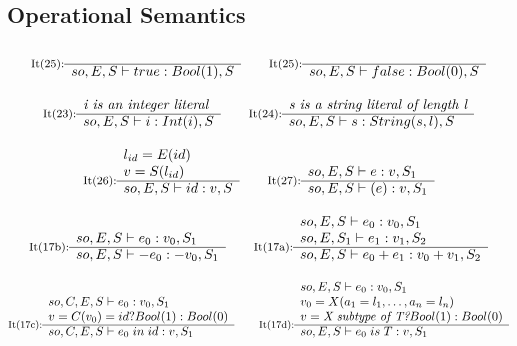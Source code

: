 \subsection{Operational Semantics}


\renewcommand{\inference}[3][]{%
  \begin{array}[b]{@{}c@{}l@{}}
    \smash{\raisebox{-.5\normalbaselineskip}{\footnotesize #1}} & 
      \begin{array}[b]{l}
        #2
      \end{array} \\
      \cline{2-2}
    & \begin{array}[t]{l}
        #3
      \end{array}
  \end{array}
}

\mathlig{->}{\rightarrow}
\mathlig{|-}{\vdash}
\mathlig{=>}{\Rightarrow}

\mathligson

\[
\inference[It(25):]{}{so, E, S|-true:Bool(1),S}
\quad\quad
\inference[It(25):]{}{so, E, S|-false:Bool(0),S}
\]

\[
\inference[It(23):]{\textit{i is an integer literal}}{so, E, S|-i:Int(i),S}
\quad\quad
\inference[It(24):]{\textit{s is a string literal of length l}}{so, E, S|-s:String(s,l),S}
\]

\[
\inference[It(26):]{
l_{id}=E(id) \\
v = S(l_{id})
}{so, E, S|-id:v,S}
\quad\quad
\inference[It(27):]{
so, E, S|-e:v,S_1
}
{so, E, S|-(e):v,S_1}
\]

\[
\inference[It(17b):]{
so, E, S|-e_0:v_0,S_1
}{so, E, S|--e_0:-v_0,S_1}
\quad\quad
\inference[It(17a):]{
so, E, S|-e_0:v_0,S_1 \\
so, E, S_1|-e_1:v_1,S_2
}{so, E, S|-e_0+e_1:v_0+v_1,S_2}
\]

\[
\inference[It(17c):]{
so, C, E, S|-e_0:v_0,S_1 \\
v = C(v_0) = id? Bool(1):Bool(0)
}{so, C, E, S|-e_0 \; in \; id:v,S_1}
\quad\quad
\inference[It(17d):]{
so, E, S|-e_0:v_0,S_1 \\
v_0 = X(a_1=l_1, \ldots, a_n=l_n) \\
v = \textit{X subtype of T?} Bool(1):Bool(0)
}{so, E, S|-e_0\; is \; T:v,S_1}
\]

